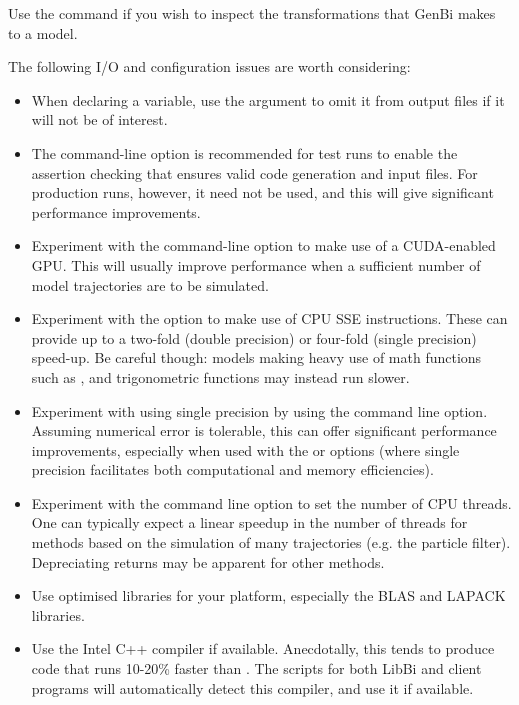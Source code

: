Use the  command if you wish to inspect the transformations
that GenBi makes to a model.

The following I/O and configuration issues are worth considering:
\begin{itemize}
\item When declaring a variable, use the  argument to omit it from
  output files if it will not be of interest.

\item The  command-line option is recommended for test runs to
  enable the assertion checking that ensures valid
  code generation and input files. For production runs, however, it need not
  be used, and this will give significant performance improvements.

\item Experiment with the  command-line option to make use of a
  CUDA-enabled GPU. This will usually improve performance when a
  sufficient number of model trajectories are to be simulated.

\item Experiment with the  option to make use of CPU SSE
  instructions. These can provide up to a two-fold
  (double precision) or four-fold (single precision) speed-up. Be careful
  though: models making heavy use of math functions such as ,
   and trigonometric functions may instead run slower.

\item Experiment with using single precision by using
  the  command line option. Assuming numerical error is
  tolerable, this can offer significant performance improvements, especially
  when used with the  or  options (where single
  precision facilitates both computational and memory efficiencies).

\item {}Experiment with the  command
  line option to set the number of CPU threads. One can typically expect a
  linear speedup in the number of threads for methods based on the simulation
  of many trajectories (e.g. the particle filter). Depreciating returns may be
  apparent for other methods.

\item Use optimised libraries for your platform, especially the
  BLAS and LAPACK libraries.

\item Use the Intel C++ compiler if
  available. Anecdotally, this tends to produce code that runs 10-20\% faster
  than . The  scripts for both LibBi
  and client programs will automatically detect this compiler,
  and use it if available.

\end{itemize}

